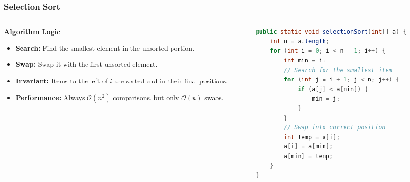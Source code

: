 \documentclass[8pt,aspectratio=169]{beamer}
\begin{document}
\begin{frame}[t, fragile]
\frametitle{Selection Sort}

\begin{columns}[T]
    \begin{column}{0.45\textwidth}
        \textbf{Algorithm Logic}
        \begin{itemize}
            \item \textbf{Search:} Find the smallest element in the unsorted portion.
            \item \textbf{Swap:} Swap it with the first unsorted element.
            \item \textbf{Invariant:} Items to the left of $i$ are sorted and in their final positions.
            \item \textbf{Performance:} Always $\mathcal{O}(n^2)$ comparisons, but only $\mathcal{O}(n)$ swaps.
        \end{itemize}
    \end{column}

    \begin{column}{0.55\textwidth}
\begin{lstlisting}[language=Java, basicstyle=\tiny\ttfamily, keywordstyle=\color{blue}, frame=single]
public static void selectionSort(int[] a) {
    int n = a.length;
    for (int i = 0; i < n - 1; i++) {
        int min = i;
        // Search for the smallest item
        for (int j = i + 1; j < n; j++) {
            if (a[j] < a[min]) {
                min = j;
            }
        }
        // Swap into correct position
        int temp = a[i];
        a[i] = a[min];
        a[min] = temp;
    }
}
\end{lstlisting}
    \end{column}
\end{columns}



\end{frame}
\end{document}
